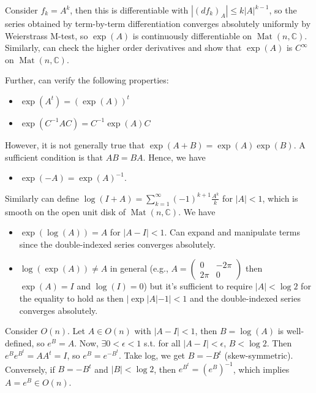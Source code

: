 \documentclass{article}
\theoremstyle{definition}
\theoremstyle{remark}
\theoremstyle{plain}
\newcommand{\CC}{\mathbb{C}}
\begin{document}
Consider $f_k=A^k$, then this is differentiable with $|(df_k)_A|\le k|A|^{k-1}$, so the series obtained by term-by-term differentiation converges absolutely uniformly by Weierstrass M-test, so $\exp(A)$ is continuously differentiable on $\operatorname{Mat}(n,\CC)$. Similarly, can check the higher order derivatives and show that $\exp(A)$ is $C^\infty$ on $\operatorname{Mat}(n,\CC)$.

Further, can verify the following properties:
\begin{itemize}
    \item $\exp(A^t)=(\exp(A))^t$
    \item $\exp(C^{-1}AC)=C^{-1}\exp(A)C$
\end{itemize}
However, it is not generally true that $\exp(A+B)=\exp(A)\exp(B)$. A sufficient condition is that $AB=BA$.
Hence, we have \begin{itemize}
    \item $\exp(-A)=\exp(A)^{-1}$.
\end{itemize}

Similarly can define $\log(I+A)=\sum_{k=1}^\infty (-1)^{k+1}\frac{A^k}{k}$ for $|A|<1$, which is smooth on the open unit disk of $\operatorname{Mat}(n,\CC)$. We have
\begin{itemize}
    \item $\exp(\log(A))=A$ for $|A-I|<1$. Can expand and manipulate terms since the double-indexed series converges absolutely.
    \item $\log(\exp(A))\neq A$ in general (e.g., $A=\begin{pmatrix}
        0&-2\pi\\ 2\pi&0
    \end{pmatrix}$ then $\exp(A)=I$ and $\log(I)=0$) but it's sufficient to require $|A|<\log 2$ for the equality to hold as then $|\exp|A|-1|<1$ and the double-indexed series converges absolutely.
\end{itemize}
Consider $O(n)$. Let $A\in O(n)$ with $|A-I|<1$, then $B=\log(A)$ is well-defined, so $e^B=A$. Now, $\exists 0<\epsilon<1$ s.t. for all $|A-I|<\epsilon$, $B<\log 2$. Then $e^Be^{B^t}=AA^t=I$, so $e^B=e^{-B^t}$. Take log, we get $B=-B^t$ (skew-symmetric). Conversely, if $B=-B^t$ and $|B|<\log 2$, then $e^{B^t}=(e^B)^{-1}$, which implies $A=e^B\in O(n)$.
\end{document}
